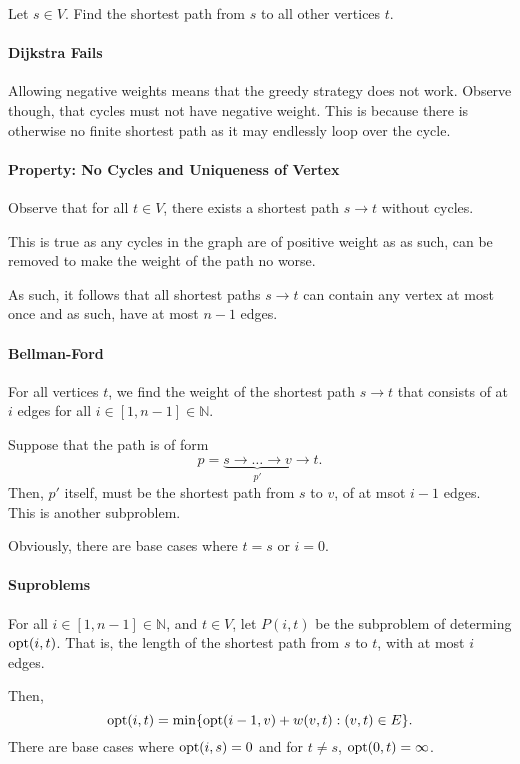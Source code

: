 Let \(s \in V\). Find the shortest path from \(s\) to all other vertices  \(t\).

\paragraph{Dijkstra Fails}
Allowing negative weights means that the greedy strategy does not work.
Observe though, that cycles must not have negative weight. This is because
there is otherwise no finite shortest path as it may endlessly loop over the
cycle.

\paragraph{Property: No Cycles and Uniqueness of Vertex}
Observe that for all \(t \in V\), there exists a shortest path \(s \to  t\) without cycles.

This is true as any cycles in the graph are of positive weight as as such, can
be removed to make the weight of the path no worse.

As such, it follows that all shortest paths \(s \to t\) can contain any vertex at most once
and as such, have at most  \(n - 1\) edges.

\paragraph{Bellman-Ford}
For all vertices \(t\), we find the weight of the shortest path  \(s \to t\)
that consists of at \(i\) edges for all  \(i \in [1, n - 1] \in \mathbb{N}\).

Suppose that the path is of form \[
  p = \underbrace{s \to  \ldots \to  v}_{p'} \to  t
.\] 
Then, \(p'\) itself, must be the shortest path from \(s\) to \(v\),
of at msot  \(i - 1\) edges. This is another subproblem.

Obviously, there are base cases where  \(t = s\) or  \(i = 0\).

\paragraph{Suproblems}
For all \(i \in [1, n - 1] \in \mathbb{N}\), and \(t \in  V\), let \(P(i, t)\)
be the subproblem of determing  \(\mathrm{opt}(i, t)\). That is, the length of
the shortest path from  \(s\) to  \(t\), with at most  \(i\) edges.

Then,  \[
  \mathrm{opt}(i, t) = \min \{
    \mathrm{opt}(i - 1, v) + w(v, t) : (v, t) \in E
  \} 
.\] 
There are base cases where \(\mathrm{opt}(i, s) = 0\) and  for \(t \neq s\),  \(\mathrm{opt}(0, t) = \infty\).

